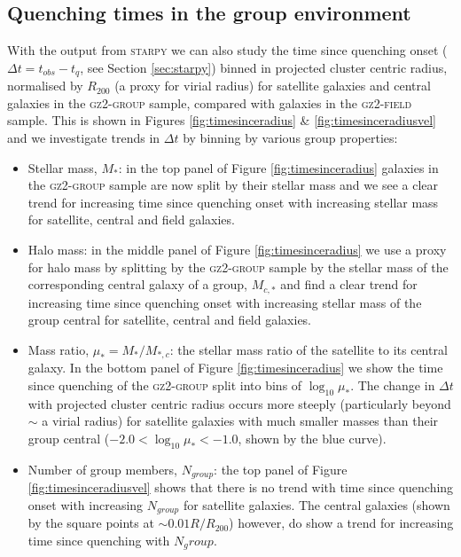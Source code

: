 \documentclass[useAMS,usenatbib]{mn2e}
\def\starpy ~{\textsc{starpy}}
\begin{document}
\subsection{Quenching times in the group environment}

With the output from \starpy~ we can also study the time since quenching onset ($\Delta t = t_{obs} - t_{q}$, see Section \ref{sec:starpy}) binned in projected cluster centric radius, normalised by $R_{200}$ (a proxy for virial radius) for satellite galaxies and central galaxies in the \textsc{gz2-group} sample, compared with galaxies in the \textsc{gz2-field} sample. This is shown in Figures \ref{fig:timesinceradius} \& \ref{fig:timesinceradiusvel} and we investigate trends in $\Delta t$ by binning by various group properties:
\begin{itemize}

\item{Stellar mass, $M_*$: in the top panel of Figure \ref{fig:timesinceradius} galaxies in the \textsc{gz2-group} sample are now split by their stellar mass and we see a clear trend for increasing time since quenching onset with increasing stellar mass for satellite, central and field galaxies.}

\item{Halo mass: in the middle panel of Figure \ref{fig:timesinceradius} we use a proxy for halo mass by splitting by the \textsc{gz2-group} sample by the stellar mass of the corresponding central galaxy of a group, $M_{c,*}$ and find a clear trend for increasing time since quenching onset with increasing stellar mass of the group central for satellite, central and field galaxies.}

\item{Mass ratio, $\mu_* = M_*/M_{*,c}$: the stellar mass ratio of the satellite to its central galaxy. In the bottom panel of Figure \ref{fig:timesinceradius} we show the time since quenching of the \textsc{gz2-group} split into bins of $\log_{10}\mu_*$. The change in $\Delta t $ with projected cluster centric radius occurs more steeply (particularly beyond $\sim$ a virial radius) for satellite galaxies with much smaller masses than their group central ($-2.0 < \log_{10}\mu_* < -1.0$, shown by the blue curve).}

\item{Number of group members, $N_{group}$: the top panel of Figure \ref{fig:timesinceradiusvel} shows that there is no trend with time since quenching onset with increasing $N_{group}$ for satellite galaxies. The central galaxies (shown by the square points at $\sim 0.01 R/R_{200}$) however, do show a trend for increasing time since quenching with $N_group$.}


\end{itemize}
\end{document}

